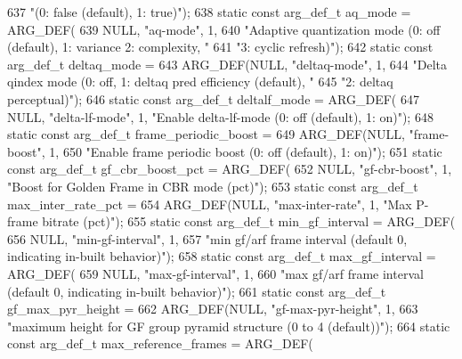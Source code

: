 \begin{DoxyCodeInclude}
{{{{{{{637             \textcolor{stringliteral}{"(0: false (default), 1: true)"});
638 \textcolor{keyword}{static} \textcolor{keyword}{const} arg\_def\_t aq\_mode = ARG\_DEF(
639     NULL, \textcolor{stringliteral}{"aq-mode"}, 1,
640     \textcolor{stringliteral}{"Adaptive quantization mode (0: off (default), 1: variance 2: complexity, "}
641     \textcolor{stringliteral}{"3: cyclic refresh)"});
642 \textcolor{keyword}{static} \textcolor{keyword}{const} arg\_def\_t deltaq\_mode =
643     ARG\_DEF(NULL, \textcolor{stringliteral}{"deltaq-mode"}, 1,
644             \textcolor{stringliteral}{"Delta qindex mode (0: off, 1: deltaq pred efficiency (default), "}
645             \textcolor{stringliteral}{"2: deltaq perceptual)"});
646 \textcolor{keyword}{static} \textcolor{keyword}{const} arg\_def\_t deltalf\_mode = ARG\_DEF(
647     NULL, \textcolor{stringliteral}{"delta-lf-mode"}, 1, \textcolor{stringliteral}{"Enable delta-lf-mode (0: off (default), 1: on)"});
648 \textcolor{keyword}{static} \textcolor{keyword}{const} arg\_def\_t frame\_periodic\_boost =
649     ARG\_DEF(NULL, \textcolor{stringliteral}{"frame-boost"}, 1,
650             \textcolor{stringliteral}{"Enable frame periodic boost (0: off (default), 1: on)"});
651 \textcolor{keyword}{static} \textcolor{keyword}{const} arg\_def\_t gf\_cbr\_boost\_pct = ARG\_DEF(
652     NULL, \textcolor{stringliteral}{"gf-cbr-boost"}, 1, \textcolor{stringliteral}{"Boost for Golden Frame in CBR mode (pct)"});
653 \textcolor{keyword}{static} \textcolor{keyword}{const} arg\_def\_t max\_inter\_rate\_pct =
654     ARG\_DEF(NULL, \textcolor{stringliteral}{"max-inter-rate"}, 1, \textcolor{stringliteral}{"Max P-frame bitrate (pct)"});
655 \textcolor{keyword}{static} \textcolor{keyword}{const} arg\_def\_t min\_gf\_interval = ARG\_DEF(
656     NULL, \textcolor{stringliteral}{"min-gf-interval"}, 1,
657     \textcolor{stringliteral}{"min gf/arf frame interval (default 0, indicating in-built behavior)"});
658 \textcolor{keyword}{static} \textcolor{keyword}{const} arg\_def\_t max\_gf\_interval = ARG\_DEF(
659     NULL, \textcolor{stringliteral}{"max-gf-interval"}, 1,
660     \textcolor{stringliteral}{"max gf/arf frame interval (default 0, indicating in-built behavior)"});
661 \textcolor{keyword}{static} \textcolor{keyword}{const} arg\_def\_t gf\_max\_pyr\_height =
662     ARG\_DEF(NULL, \textcolor{stringliteral}{"gf-max-pyr-height"}, 1,
663             \textcolor{stringliteral}{"maximum height for GF group pyramid structure (0 to 4 (default))"});
664 \textcolor{keyword}{static} \textcolor{keyword}{const} arg\_def\_t max\_reference\_frames = ARG\_DEF(
}}}}}}}
\end{DoxyCodeInclude}
